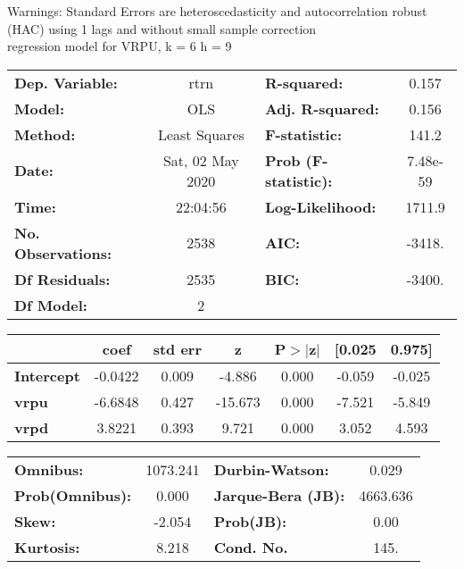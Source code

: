 Warnings: \newline
 [1] Standard Errors are heteroscedasticity and autocorrelation robust (HAC) using 1 lags and without small sample correction\\ 

regression model for VRPU, k = 6 h = 9\begin{center}
\begin{tabular}{lclc}
\toprule
\textbf{Dep. Variable:}    &       rtrn       & \textbf{  R-squared:         } &     0.157   \\
\textbf{Model:}            &       OLS        & \textbf{  Adj. R-squared:    } &     0.156   \\
\textbf{Method:}           &  Least Squares   & \textbf{  F-statistic:       } &     141.2   \\
\textbf{Date:}             & Sat, 02 May 2020 & \textbf{  Prob (F-statistic):} &  7.48e-59   \\
\textbf{Time:}             &     22:04:56     & \textbf{  Log-Likelihood:    } &    1711.9   \\
\textbf{No. Observations:} &        2538      & \textbf{  AIC:               } &    -3418.   \\
\textbf{Df Residuals:}     &        2535      & \textbf{  BIC:               } &    -3400.   \\
\textbf{Df Model:}         &           2      & \textbf{                     } &             \\
\bottomrule
\end{tabular}
\begin{tabular}{lcccccc}
                   & \textbf{coef} & \textbf{std err} & \textbf{z} & \textbf{P$> |$z$|$} & \textbf{[0.025} & \textbf{0.975]}  \\
\midrule
\textbf{Intercept} &      -0.0422  &        0.009     &    -4.886  &         0.000        &       -0.059    &       -0.025     \\
\textbf{vrpu}      &      -6.6848  &        0.427     &   -15.673  &         0.000        &       -7.521    &       -5.849     \\
\textbf{vrpd}      &       3.8221  &        0.393     &     9.721  &         0.000        &        3.052    &        4.593     \\
\bottomrule
\end{tabular}
\begin{tabular}{lclc}
\textbf{Omnibus:}       & 1073.241 & \textbf{  Durbin-Watson:     } &    0.029  \\
\textbf{Prob(Omnibus):} &   0.000  & \textbf{  Jarque-Bera (JB):  } & 4663.636  \\
\textbf{Skew:}          &  -2.054  & \textbf{  Prob(JB):          } &     0.00  \\
\textbf{Kurtosis:}      &   8.218  & \textbf{  Cond. No.          } &     145.  \\
\bottomrule
\end{tabular}
\end{center}

